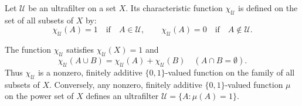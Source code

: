 Let $\mathcal{U}$ be an ultrafilter on a set $X$. Its characteristic function $\chi_{\mathcal{U}}$ is defined on the set of all subsets of $X$ by:
$$\chi_{\mathcal{U}}(A) = 1 \quad \text{if} \quad A \in \mathcal{U}, \qquad \chi_{\mathcal{U}}(A) = 0 \quad \text{if} \quad A \notin \mathcal{U}.$$

The function $\chi_{\mathcal{U}}$ satisfies $\chi_{\mathcal{U}}(X) = 1$ and
$$\chi_{\mathcal{U}}(A \cup B) = \chi_{\mathcal{U}}(A) + \chi_{\mathcal{U}}(B) \quad (A \cap B = \emptyset).$$
Thus $\chi_{\mathcal{U}}$ is a nonzero, finitely additive $\{0,1\}$-valued function on the family of all subsets of $X$.
Conversely, any nonzero, finitely additive $\{0,1\}$-valued function $\mu$ on the power set of $X$ defines an ultrafilter $\mathcal{U} = \{A : \mu(A) = 1\}$.